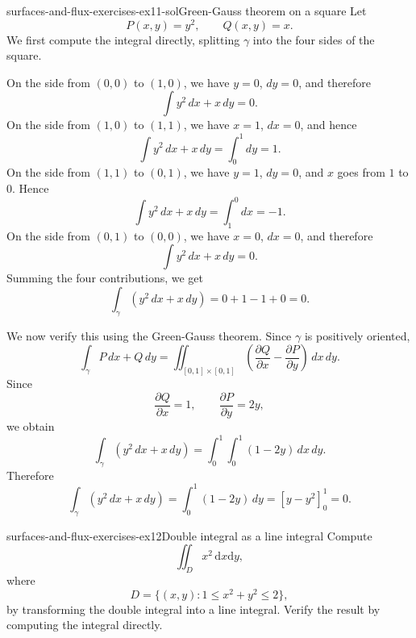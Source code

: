 \documentclass[preview]{standalone}
\begin{document}
\begin{snippetsolution}{surfaces-and-flux-exercises-ex11-sol}{Green-Gauss theorem on a square}
    Let
    \[
        P(x,y)=y^2,
        \qquad
        Q(x,y)=x.
    \]
    We first compute the integral directly, splitting \(\gamma\) into the four sides of the square.

    On the side from \((0,0)\) to \((1,0)\), we have \(y=0\), \(dy=0\), and therefore
    \[
        \int y^2\,dx+x\,dy=0.
    \]
    On the side from \((1,0)\) to \((1,1)\), we have \(x=1\), \(dx=0\), and hence
    \[
        \int y^2\,dx+x\,dy
        =
        \int_0^1 dy
        =
        1.
    \]
    On the side from \((1,1)\) to \((0,1)\), we have \(y=1\), \(dy=0\), and \(x\) goes from \(1\) to \(0\). Hence
    \[
        \int y^2\,dx+x\,dy
        =
        \int_1^0 dx
        =
        -1.
    \]
    On the side from \((0,1)\) to \((0,0)\), we have \(x=0\), \(dx=0\), and therefore
    \[
        \int y^2\,dx+x\,dy=0.
    \]
    Summing the four contributions, we get
    \[
        \int_{\gamma}\left(y^2\,dx+x\,dy\right)
        =
        0+1-1+0
        =
        0.
    \]

    We now verify this using the Green-Gauss theorem. Since \(\gamma\) is positively oriented,
    \[
        \int_{\gamma}P\,dx+Q\,dy
        =
        \iint_{[0,1]\times[0,1]}
        \left(
            \frac{\partial Q}{\partial x}
            -
            \frac{\partial P}{\partial y}
        \right)
        \,dx\,dy.
    \]
    Since
    \[
        \frac{\partial Q}{\partial x}=1,
        \qquad
        \frac{\partial P}{\partial y}=2y,
    \]
    we obtain
    \[
        \int_{\gamma}\left(y^2\,dx+x\,dy\right)
        =
        \int_0^1\int_0^1 (1-2y)\,dx\,dy.
    \]
    Therefore
    \[
        \int_{\gamma}\left(y^2\,dx+x\,dy\right)
        =
        \int_0^1(1-2y)\,dy
        =
        \left[y-y^2\right]_0^1
        =
        0.
    \]
\end{snippetsolution}

\begin{snippetexercise}{surfaces-and-flux-exercises-ex12}{Double integral as a line integral}
    Compute \[\iint_D x^2\,\mathrm{d}x\mathrm{d}y,\] where \[D=\{(x,y):1\leq x^2+y^2\leq 2\},\] by transforming the double integral into a line integral. Verify the result by computing the integral directly.
\end{snippetexercise}
\end{document}
